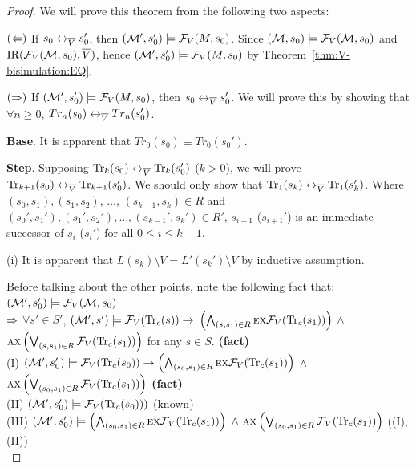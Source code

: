 \documentclass{article}
\begin{document}
\begin{proof}
We will prove this theorem from the following two aspects:

$(\Leftarrow)$ If $s_0 \leftrightarrow_{\overline V} s_0'$, then $({\cal M}',s_0') \models {\cal F}_V(M,s_0)$. Since $({\cal M}, s_0) \models {\cal F}_V({\cal M}, s_0)$ and $\textrm{IR}({\cal F}_V({\cal M}, s_0), \overline V)$, hence
$({\cal M}',s_0') \models {\cal F}_V(M,s_0)$ by Theorem~\ref{thm:V-bisimulation:EQ}.

$(\Rightarrow)$ If $({\cal M}',s_0') \models {\cal F}_V(M,s_0)$, then $s_0 \leftrightarrow_{\overline V} s_0'$. We will prove this by showing that $\forall n \geq 0$, $Tr_n(s_0) \leftrightarrow_{\overline V} Tr_n(s_0')$.


\textbf{Base}. It is apparent that $Tr_0(s_0) \equiv Tr_0(s_0')$.

\textbf{Step}. Supposing $\textrm{Tr}_k(s_0) \leftrightarrow_{\overline V} \textrm{Tr}_k(s_0')$ ($k > 0$), we will prove $\textrm{Tr}_{k+1}(s_0) \leftrightarrow_{\overline V} \textrm{Tr}_{k+1}(s_0')$. We should only show that $\textrm{Tr}_1(s_k) \leftrightarrow_{\overline V} \textrm{Tr}_1(s_k')$. Where $(s_0, s_1), (s_1, s_2)$, $\dots$, $(s_{k-1}, s_k) \in R$ and $(s_0', s_1'), (s_1', s_2'), \dots, (s_{k-1}', s_k') \in R'$, \ie $s_{i+1}$ ($s_{i+1}'$) is an immediate successor of $s_i$ ($s_i'$) for all $0 \leq i \leq k-1$.

      (i) It is apparent that $L(s_k) \setminus \overline V = L'(s_k') \setminus \overline V$ by inductive assumption.

      Before talking about the other points, note the following fact that:\\
      $({\cal M}',s_0') \models {\cal F}_V({\cal M},s_0)$\\
      $\Rightarrow$ $\forall s'\in S'$, $({\cal M}', s')\models {\cal F}_V(\textrm{Tr}_c(s)) \rightarrow$ $\left(\bigwedge_{(s,s_1)\in R} \textsc{e} \textsc{x} {\cal F}_V(\textrm{Tr}_c(s_1))\right)$ $\wedge$ $\textsc{a} \textsc{x} \left( \bigvee_{(s,s_1)\in R} {\cal F}_V(\textrm{Tr}_c(s_1))\right)$  for any $s\in S$.   \hfill  \textbf{(fact)}\\
      (I) $({\cal M}', s_0') \models {\cal F}_V(\textrm{Tr}_c(s_0)) \rightarrow \left(\bigwedge_{(s_0, s_1) \in R} \textsc{e} \textsc{x} {\cal F}_V(\textrm{Tr}_c(s_1))\right)$ $\wedge$ $\textsc{a} \textsc{x} \left(\bigvee_{(s_0, s_1) \in R} {\cal F}_V(\textrm{Tr}_c(s_1)) \right)$     \hfill  \textbf{(fact)}\\
        (II) $({\cal M}', s_0') \models {\cal F}_V(\textrm{Tr}_c(s_0)))$  \hfill  (known)\\
        (III) $({\cal M}', s_0') \models \left(\bigwedge_{(s_0, s_1) \in R} \textsc{e} \textsc{x} {\cal F}_V(\textrm{Tr}_c(s_1))\right)$ $\wedge$ $\textsc{a} \textsc{x} \left(\bigvee_{(s_0, s_1) \in R} {\cal F}_V(\textrm{Tr}_c(s_1)) \right)$  \hfill  ((I),(II))\\


\end{proof}
\end{document}
